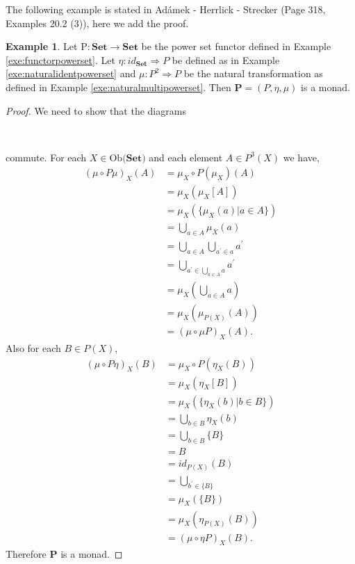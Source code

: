 \documentclass[11pt,a4paper]{article}
\theoremstyle{definition}
\newtheorem{example}[thm]{Example}
\newcommand\ob[1]{\mathrm{Ob(}#1\mathrm{)}}
\newcommand\func[3]{\mathrm{#1}\colon#2\rightarrow#3}
\newcommand\nattran[3]{#1\colon#2\Rightarrow#3}
\numberwithin{equation}{section}
\begin{document}
The following example is stated in Adámek - Herrlick - Strecker \cite{ACC} \cite{ACC} (Page 318, Examples 20.2 (3)), here we add the proof.
\begin{example}
    \label{exe:powersetmonad}
    Let $\func{P}{\mathbf{Set}}{\mathbf{Set}}$ be the power set functor defined in Example \ref{exe:functorpowerset}. Let $\nattran{\eta}{id_{\mathbf{Set}}}{P}$ be defined as in Example \ref{exe:naturalidentpowerset} and $\nattran{\mu}{P^2}{P}$ be the natural transformation as defined in Example \ref{exe:naturalmultipowerset}. Then $\mathbf{P} = (P,\eta,\mu)$ is a monad.
\end{example}
\begin{proof}
We need to show that the diagrams 
    \begin{center}
\\
\end{center}
commute. 
For each $X\in\ob{\mathbf{Set}}$ and each element $A\in P^3(X)$ we have,
\begin{align*}
    (\mu \circ P\mu)_{X}(A) &= \mu_{X} \circ P(\mu_{X})(A) \\
    &=  \mu_{X}(\mu_{X}[A])\\
    &= \mu_{X}(\{\mu_{X}(a)|a\in A\}) \\
    &= \bigcup_{a\in A}\mu_{X}(a)\\
    &= \bigcup_{a\in A}\bigcup_{a^\prime\in a}a^\prime \\
    &= \bigcup_{a^\prime\in\bigcup_{a\in A}a}a^\prime\\
    &= \mu_{X}(\bigcup_{a\in A}a)\\
    &= \mu_{X}(\mu_{P(X)}(A))\\
    &= (\mu \circ \mu P)_{X}(A).
\end{align*}
Also for each $B\in P(X)$,
\begin{align*}
    (\mu \circ P\eta)_{X}(B) &= \mu_{X} \circ P(\eta_{X}(B)) \\
    &= \mu_{X}(\eta_{X}[B])\\
    &= \mu_{X}(\{\eta_{X}(b)|b\in B\})\\
    &= \bigcup_{b\in B}\eta_{X}(b)\\
    &= \bigcup_{b\in B}\{B\}\\
    &= B\\
    &= id_{P(X)}(B)\\
    &= \bigcup_{b^\prime\in\{B\}}\\
    &= \mu_{X}(\{B\})\\
    &= \mu_{X}(\eta_{P(X)}(B))\\
    &= (\mu \circ \eta P)_{X}(B).
\end{align*}
Therefore $\mathbf{P}$ is a monad.
\end{proof}
\end{document}
